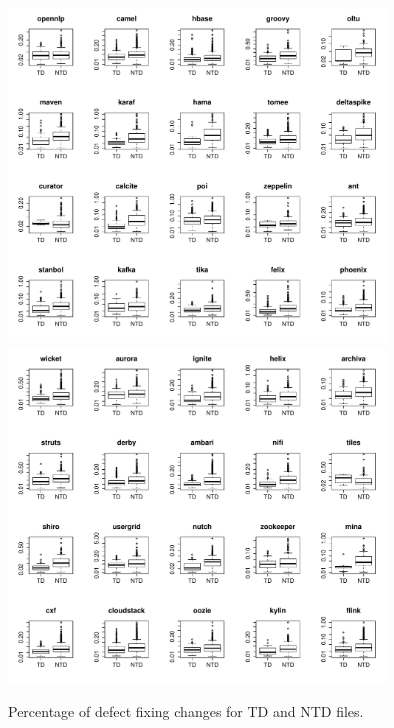 \begin{figure}[tb]
	\centering
	\includegraphics[width=100mm]{figures/chapter4/RQ1_boxplots_td_1}
	\includegraphics[width=100mm]{figures/chapter4/RQ1_boxplots_td_2}
	\caption{Percentage of defect fixing changes for TD and NTD files.}
	\label{figure:percentage_of_defects_td_vs_ntd}
\end{figure}



